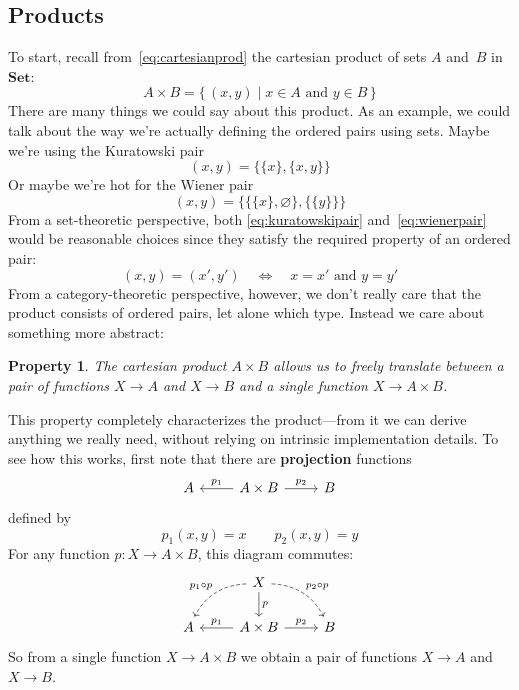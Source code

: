 \documentclass[letterpaper,12pt]{article}
\newcommand{\after}{\circ}
\newcommand{\cat}[1]{\mathbf{#1}}
\newcommand{\Set}{\cat{Set}}
\newcommand{\textdefn}{\textbf}
\theoremstyle{definition}
\theoremstyle{plain}
\newtheorem{propy}[equation]{Property}
\numberwithin{equation}{section}
\begin{document}
\subsection{Products}
To start, recall from~\eqref{eq:cartesianprod} the cartesian product  of sets \(A\) and~\(B\) in~\(\Set\):
\[A\times B=\{\,(x,y)\mid x\in A\text{ and }y\in B\,\}\]
There are many things we could say about this product. As an example, we could talk about the way we're actually defining the ordered pairs using sets. Maybe we're using the Kuratowski pair
\begin{equation}
(x,y)=\{\{x\},\{x,y\}\}
\label{eq:kuratowskipair}
\end{equation}
Or maybe we're hot for the Wiener pair
\begin{equation}
(x,y)=\{\{\{x\},\varnothing\},\{\{y\}\}\}
\label{eq:wienerpair}
\end{equation}
From a set-theoretic perspective, both \eqref{eq:kuratowskipair} and~\eqref{eq:wienerpair} would be reasonable choices since they satisfy the required property of an ordered pair:
\[(x,y)=(x',y')\quad\iff\quad x=x'\text{ and }y=y'\]
From a category-theoretic perspective, however, we don't really care that the product consists of ordered pairs, let alone which type. Instead we care about something more abstract:
\begin{propy}
The cartesian product \(A\times B\) allows us to freely translate between a pair of functions \(X\to A\) and \(X\to B\) and a single function \(X\to A\times B\).
\label{propy:cartesianprod}
\end{propy}
\noindent This property completely characterizes the product---from it we can derive anything we really need, without relying on intrinsic implementation details. To see how this works, first note that there are \textdefn{projection} functions
\begin{equation}
\begin{tikzcd}
A & \ar[l,"p_1"'] A\times B \ar[r,"p_2"] & B
\end{tikzcd}
\label{cd:cartesianprod}
\end{equation}
defined by
\[p_1(x,y)=x\qquad p_2(x,y)=y\]
For any function \(p:X\to A\times B\), this diagram commutes:
\begin{equation}
\begin{tikzcd}
 & X \ar[ld,dashed,bend right,"p_1\after p"'] \ar[d, "p"] \ar[rd,dashed,bend left,"p_2\after p"] & \\
A & \ar[l,"p_1"'] A\times B \ar[r,"p_2"] & B
\end{tikzcd}
\label{cd:cartesianprodproj}
\end{equation}
So from a single function \(X\to A\times B\) we obtain a pair of functions \(X\to A\) and \(X\to B\).
\end{document}
